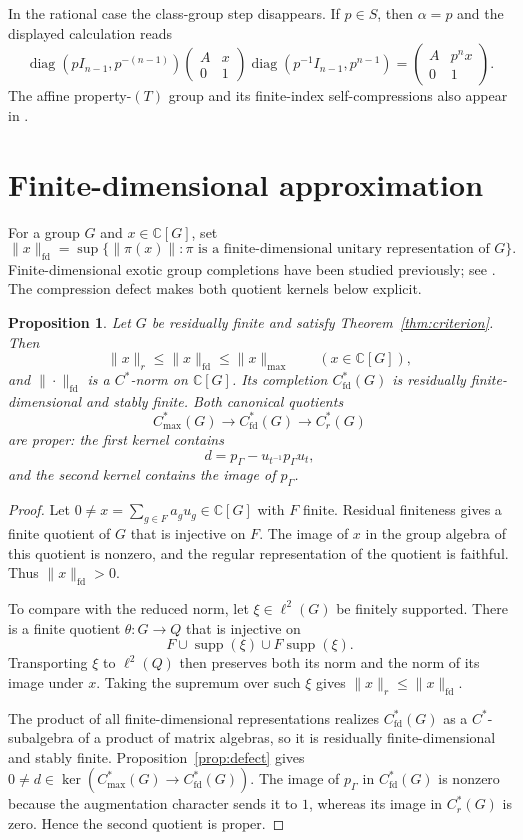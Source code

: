 \documentclass[11pt]{article}
\newtheorem{proposition}[theorem]{Proposition}
\newcommand{\C}{\mathbb C}
\newcommand{\Cmax}[1]{C^*_{\max}(#1)}
\newcommand{\Cr}[1]{C^*_r(#1)}
\newcommand{\Cfd}[1]{C^*_{\mathrm{fd}}(#1)}
\begin{document}
In the rational case the class-group step disappears.  If $p\in S$, then
$\alpha=p$ and the displayed calculation reads
\[
 \operatorname{diag}(pI_{n-1},p^{-(n-1)})
 \begin{pmatrix}A&x\\0&1\end{pmatrix}
 \operatorname{diag}(p^{-1}I_{n-1},p^{n-1})
 =\begin{pmatrix}A&p^n x\\0&1\end{pmatrix}.
\]
The affine property-$(T)$ group and its finite-index self-compressions also
appear in \cite[Proposition~1.1]{deCornulier}.

\section{Finite-dimensional approximation}\label{sec:completion}

For a group $G$ and $x\in\C[G]$, set
\[
 \|x\|_{\mathrm{fd}}
 =\sup\{\|\pi(x)\|:\pi\text{ is a finite-dimensional unitary
 representation of }G\}.
\]
Finite-dimensional exotic group completions have been studied previously;
see \cite{Wiersma,RuanWiersma}.  The compression defect makes both quotient
kernels below explicit.

\begin{proposition}\label{prop:completion}
Let $G$ be residually finite and satisfy Theorem~\ref{thm:criterion}.  Then
\[
 \|x\|_r\leq\|x\|_{\mathrm{fd}}\leq\|x\|_{\max}
 \qquad(x\in\C[G]),
\]
and $\|\cdot\|_{\mathrm{fd}}$ is a $C^*$-norm on $\C[G]$.  Its completion
$\Cfd G$ is residually finite-dimensional and stably finite.  Both canonical
quotients
\[
 \Cmax G\longrightarrow\Cfd G\longrightarrow\Cr G
\]
are proper: the first kernel contains
\[
 d=p_\Gamma-u_{t^{-1}}p_\Gamma u_t,
\]
and the second kernel contains the image of $p_\Gamma$.
\end{proposition}

\begin{proof}
Let $0\neq x=\sum_{g\in F}a_gu_g\in\C[G]$ with $F$ finite.  Residual
finiteness gives a finite quotient of $G$ that is injective on $F$.  The
image of $x$ in the group algebra of this quotient is nonzero, and the
regular representation of the quotient is faithful.  Thus
$\|x\|_{\mathrm{fd}}>0$.

To compare with the reduced norm, let $\xi\in\ell^2(G)$ be finitely
supported.  There is a finite quotient $\theta:G\to Q$ that is injective on
\[
 F\cup\operatorname{supp}(\xi)\cup F\operatorname{supp}(\xi).
\]
Transporting $\xi$ to $\ell^2(Q)$ then preserves both its norm and the norm
of its image under $x$.  Taking the supremum over such $\xi$ gives
$\|x\|_r\leq\|x\|_{\mathrm{fd}}$.

The product of all finite-dimensional representations realizes $\Cfd G$ as
a $C^*$-subalgebra of a product of matrix algebras, so it is residually
finite-dimensional and stably finite.  Proposition~\ref{prop:defect} gives
$0\neq d\in\ker(\Cmax G\to\Cfd G)$.  The image of $p_\Gamma$ in
$\Cfd G$ is nonzero because the augmentation character sends it to $1$,
whereas its image in $\Cr G$ is zero.  Hence the second quotient is proper.
\end{proof}
\end{document}
